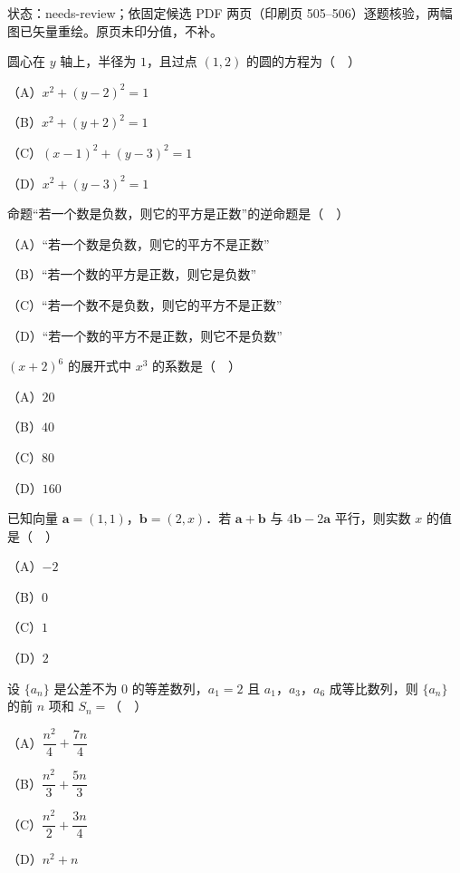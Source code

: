 

状态：needs-review；依固定候选 PDF 两页（印刷页 505–506）逐题核验，两幅图已矢量重绘。原页未印分值，不补。


\begin{question}
圆心在 $y$ 轴上，半径为 $1$，且过点 $(1,2)$ 的圆的方程为（　）

（A）$x^2+(y-2)^2=1$

（B）$x^2+(y+2)^2=1$

（C）$(x-1)^2+(y-3)^2=1$

（D）$x^2+(y-3)^2=1$

\end{question}
\begin{question}
命题“若一个数是负数，则它的平方是正数”的逆命题是（　）

（A）“若一个数是负数，则它的平方不是正数”

（B）“若一个数的平方是正数，则它是负数”

（C）“若一个数不是负数，则它的平方不是正数”

（D）“若一个数的平方不是正数，则它不是负数”

\end{question}
\begin{question}
$(x+2)^6$ 的展开式中 $x^3$ 的系数是（　）

（A）$20$

（B）$40$

（C）$80$

（D）$160$

\end{question}
\begin{question}
已知向量 $\boldsymbol a=(1,1)$，$\boldsymbol b=(2,x)$．若 $\boldsymbol a+\boldsymbol b$ 与 $4\boldsymbol b-2\boldsymbol a$ 平行，则实数 $x$ 的值是（　）

（A）$-2$

（B）$0$

（C）$1$

（D）$2$

\end{question}
\begin{question}
设 $\{a_n\}$ 是公差不为 $0$ 的等差数列，$a_1=2$ 且 $a_1$，$a_3$，$a_6$ 成等比数列，则 $\{a_n\}$ 的前 $n$ 项和 $S_n=$（　）

（A）$\dfrac{n^2}4+\dfrac{7n}4$

（B）$\dfrac{n^2}3+\dfrac{5n}3$

（C）$\dfrac{n^2}2+\dfrac{3n}4$

（D）$n^2+n$

\end{question}
